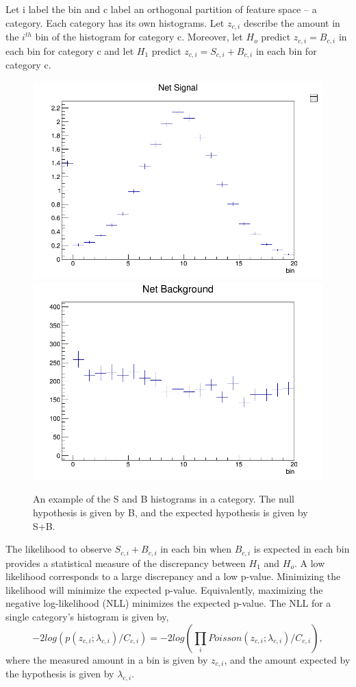 \documentclass[review]{elsarticle}
\begin{document}
Let i label the bin and c label an orthogonal partition of feature space -- a category. Each category has its own histograms. Let $z_{c,i}$ describe the amount in the $i^{th}$ bin of the histogram for category c. Moreover, let $H_o$ predict $z_{c,i} = B_{c,i}$ in each bin for category c and let $H_1$ predict $z_{c,i} = S_{c,i} + B_{c,i}$ in each bin for category c.
\begin{figure}[h!]
  \centering
  \includegraphics[width=0.49\linewidth]{binning_signal_example.png}
  \includegraphics[width=0.49\linewidth]{binning_bg_example.png}
  \caption
  {An example of the S and B histograms in a category. The null hypothesis is given by B, and the expected hypothesis is given by S+B.}
  \label{fig:binning_example}
\end{figure}
\FloatBarrier

The likelihood to observe $S_{c,i} + B_{c,i}$ in each bin when $B_{c,i}$ is expected in each bin provides a statistical measure of the discrepancy between $H_1$ and $H_o$. A low likelihood corresponds to a large discrepancy and a low p-value. Minimizing the likelihood will minimize the expected p-value. Equivalently, maximizing the negative log-likelihood (NLL) minimizes the expected p-value. The NLL for a single category's histogram is given by,  
\begin{equation}
\label{first}
-2log\left( p(z_{c,i}; \lambda_{c,i})/ C_{c,i} \right)  = -2log\left( \prod_{i} Poisson(z_{c,i}; \lambda_{c,i})/C_{c,i} \right),
\end{equation}
where the measured amount in a bin is given by $z_{c,i}$, and the amount expected by the hypothesis is given by $\lambda_{c,i}$. 
\end{document}
